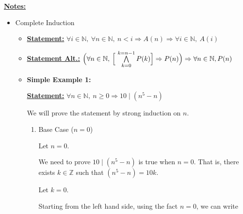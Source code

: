 \documentclass[12pt]{article}
\begin{document}
\begin{itemize}
\begin{mdframed}
\begin{enumerate}[1.]
        \end{enumerate}

    \end{mdframed}

    \bigskip

    \underline{\textbf{Notes:}}

    \bigskip

    \begin{itemize}
        \item Complete Induction
        \begin{itemize}
            \item \underline{\textbf{Statement:}} $\forall i \in \mathbb{N},\:\forall n \in \mathbb{N},\:n < i \Rightarrow A(n) \Rightarrow \forall i \in \mathbb{N},\:A(i)$
            \item \underline{\textbf{Statement Alt.:}} $\Bigl(\forall n \in \mathbb{N},\:\Bigl[ \ \bigwedge\limits_{k = 0}^{k=n-1} P(k) \Bigr] \Rightarrow P(n) \Bigr) \Rightarrow \forall n \in \mathbb{N}, P(n)$
            \item

            \begin{mdframed}
                \textbf{Simple Example 1:}

                \bigskip

                \underline{\textbf{Statement:}} $\forall n \in \mathbb{N},\:n \geq 0 \Rightarrow 10 \mid (n^5 - n)$

                \bigskip

                We will prove the statement by strong induction on $n$.

                \begin{enumerate}[1.]
                    \item Base Case ($n = 0$)

                    \begin{mdframed}

                    Let $n = 0$.

                    \bigskip

                    We need to prove $10 \mid (n^5 - n)$ is true when $n = 0$. That is,
                    there exists $k \in \mathbb{Z}$ such that $(n^5 - n) = 10k$.

                    \bigskip

                    Let $k = 0$.

                    \bigskip

                    Starting from the left hand side, using the fact $n = 0$,
                    we can write


\end{mdframed}
\end{enumerate}
\end{mdframed}
\end{itemize}
\end{itemize}
\end{itemize}
\end{document}
